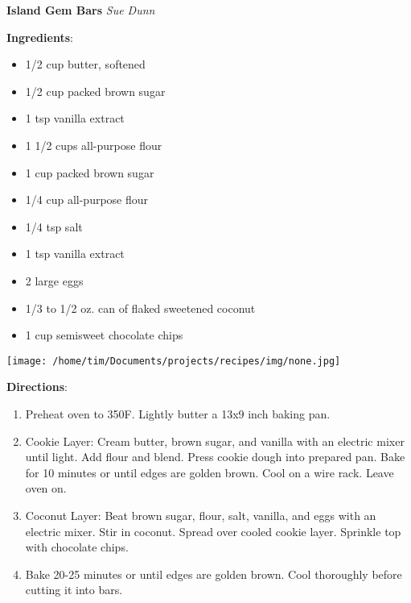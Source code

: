 \documentclass[11pt, twoside, openany]{book}
\begin{document}
\noindent\begin{minipage}[t]{\linewidth}%
{\Large\textbf{Island Gem Bars}} \label{island-gem-bars}\hfill\textit{Sue Dunn}\\
\noindent\begin{minipage}[t]{0.78\linewidth}%
\textbf{Ingredients}:\vspace{-3mm}
\begin{multicols}{2}
\begin{itemize}\setlength\itemsep{-1mm}
\item 1/2 cup butter, softened
\item 1/2 cup packed brown sugar
\item 1 tsp vanilla extract
\item 1 1/2 cups all-purpose flour
\item 1 cup packed brown sugar
\item 1/4 cup all-purpose flour
\item 1/4 tsp salt
\item 1 tsp vanilla extract
\item 2 large eggs
\item 1/3 to 1/2 oz. can of flaked sweetened coconut
\item 1 cup semisweet chocolate chips
\end{itemize}
\end{multicols}
\end{minipage}
\noindent\begin{minipage}[t]{0.18\linewidth}
\centering \strut\vspace*{-\baselineskip}\newline
\texttt{[image: /home/tim/Documents/projects/recipes/img/none.jpg]}\\
\end{minipage}\vspace{3mm}
\textbf{Directions}:
\vspace{-3mm}\begin{enumerate}\setlength\itemsep{-1mm}
\item Preheat oven to 350F. Lightly butter a 13x9 inch baking pan.
\item Cookie Layer: Cream butter, brown sugar, and vanilla with an electric mixer until light. Add flour and blend. Press cookie dough into prepared pan. Bake for 10 minutes or until edges are golden brown. Cool on a wire rack. Leave oven on.
\item Coconut Layer: Beat brown sugar, flour, salt, vanilla, and eggs with an electric mixer. Stir in coconut. Spread over cooled cookie layer. Sprinkle top with chocolate chips. 
\item Bake 20-25 minutes or until edges are golden brown. Cool thoroughly before cutting it into bars.
\end{enumerate}
\end{minipage}\vspace{8mm}
\end{document}
